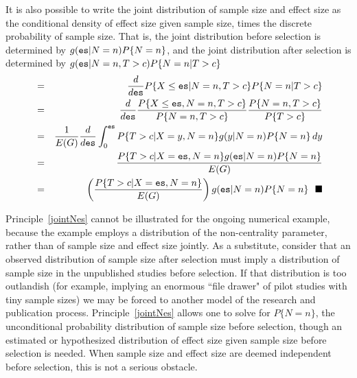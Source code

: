 \documentclass[jou]{apa6} %
\newcommand{\R}[1]{\mbox{\texttt{#1}}} %
\begin{document}
\noindent
It is also possible to write the joint distribution of sample size and effect size as the conditional density of effect size given sample size, times the discrete probability of sample size. That is, the joint distribution before selection is determined by $g(\R{es}|N=n)P\{N=n\}$, and the joint distribution after selection is determined by $g(\R{es}|N=n,T>c)P\{N=n|T>c\}$
{\small
\begin{eqnarray} \label{joynt}
    & = & 
    \frac{d}{d\R{es}} P\{X\leq\R{es}|N=n,T>c\}P\{N=n|T>c\} \nonumber \\
    & = & \frac{d}{d\R{es}}
    \frac{ P\{X\leq\R{es},N=n,T>c\} }{ P\{N=n,T>c\} } 
    \frac{P\{N=n,T>c\}}{P\{T>c\}} \nonumber \\
    & = & \frac{1}{E(G)} \frac{d}{d\R{es}}
    \int_0^{\scriptsize \R{es}} 
    P\{T>c|X=y,N=n\} g(y|N=n)P\{N=n\} \, dy \nonumber \\
    & = & 
    \frac{P\{T>c|X=\R{es},N=n\}g(\R{es}|N=n)P\{N=n\} }{E(G)} \nonumber \\
     & = &
     \left( \frac{ P\{T>c|X=\R{es},N=n\} }{E(G)} \right)
     g(\R{es}|N=n)P\{N=n\} ~~ \blacksquare
\end{eqnarray}
} %

Principle~\ref{jointNes} cannot be illustrated for the ongoing numerical example, because the example employs a distribution of the non-centrality parameter, rather than of sample size and effect size jointly. As a substitute, consider that an observed distribution of sample size after selection must imply a distribution of sample size in the unpublished studies before selection. If that distribution is too outlandish (for example, implying an enormous ``file drawer" of pilot studies with tiny sample sizes) we may be forced to another model of the research and publication process. Principle~\ref{jointNes} allows one to solve for $P\{N=n\}$, the unconditional probability distribution of sample size before selection, though an estimated or hypothesized distribution of effect size given sample size before selection is needed. When sample size and effect size are deemed independent before selection, this is not a serious obstacle.
\end{document}
